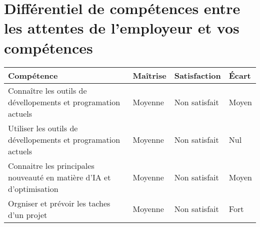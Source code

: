 \section{Différentiel de compétences entre les
attentes de l’employeur et vos compétences}

\begin{tabularx}{15cm}{|X|X|X|X|}
\hline
\rowcolor{color1}
Compétence & Maîtrise & Satisfaction & Écart\\
\hline
 Connaître les outils de  dévellopements et programation actuels & Moyenne & Non satisfait & Moyen\\
\hline
Utiliser les outils de  dévellopements et programation actuels & Moyenne & Non satisfait & Nul\\
\hline
Connaitre les principales nouveauté en matière d'IA et d'optimisation & Moyenne & Non satisfait & Moyen\\
\hline
Orgniser et prévoir les taches d'un projet  & Moyenne & Non satisfait & Fort\\
\hline
\end{tabularx}
